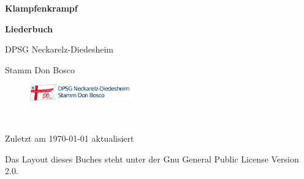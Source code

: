 \begin{titlepage}
\begin{center}
{\sffamily\huge\bfseries Klampfenkrampf\par}
{\sffamily\small\bfseries Liederbuch\par}
\vspace{0.5cm}
{\sffamily\Large DPSG Neckarelz-Diedesheim\par}
\vspace{0.5cm}
{\sffamily\Large Stamm Don Bosco\par}
\vspace{0.5cm}
\begin{figure}[h]
\centering
\includegraphics[width=0.4\textwidth]{img/logo.jpg}\par\
\end{figure}
{\sffamily\small Zuletzt am \today{} aktualisiert\par}
\vspace{0.5cm}
{\sffamily\tiny Das Layout dieses Buches steht unter der Gnu General Public License Version 2.0.\par}
\end{center}
\end{titlepage}
